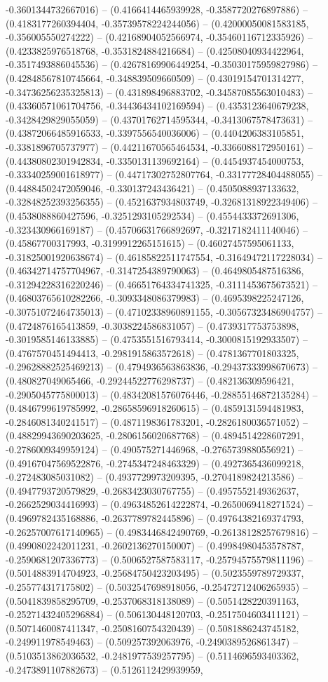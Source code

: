 -0.3601344732667016) -- (0.4166414465939928, -0.3587720276897886) -- (0.4183177260394404, -0.35739578224244056) -- (0.42000050081583185, -0.356005550274222) -- (0.42168904052566974, -0.35460116712335926) -- (0.4233825976518768, -0.3531824884216684) -- (0.42508040934422964, -0.3517493886045536) -- (0.42678169906449254, -0.35030175959827986) -- (0.42848567810745664, -0.348839509660509) -- (0.43019154701314277, -0.34736256235325813) -- (0.431898496883702, -0.34587085563010483) -- (0.43360571061704756, -0.34436434102169594) -- (0.4353123640679238, -0.3428429829055059) -- (0.43701762714595344, -0.3413067578473631) -- (0.43872066485916533, -0.3397556540036006) -- (0.4404206383105851, -0.3381896705737977) -- (0.44211670565464534, -0.3366088172950161) -- (0.44380802301942834, -0.3350131139692164) -- (0.4454937454000753, -0.33340259001618977) -- (0.44717302752807764, -0.33177728404488055) -- (0.44884502472059046, -0.330137243436421) -- (0.4505088937133632, -0.32848252393256355) -- (0.4521637934803749, -0.32681318922349406) -- (0.4538088860427596, -0.3251293105292534) -- (0.4554433372691306, -0.323430966169187) -- (0.45706631766892697, -0.3217182411140046) -- (0.45867700317993, -0.3199912265151615) -- (0.46027457595061133, -0.31825001920638674) -- (0.46185822511747554, -0.31649472117228034) -- (0.46342714757704967, -0.3147254389790063) -- (0.4649805487516386, -0.31294228316220246) -- (0.46651764334741325, -0.3111453675673521) -- (0.46803765610282266, -0.3093348086379983) -- (0.4695398225247126, -0.30751072464735013) -- (0.47102338960891155, -0.30567323486904757) -- (0.4724876165413859, -0.3038224586831057) -- (0.4739317753753898, -0.3019585146133885) -- (0.4753551516793414, -0.3000815192933507) -- (0.4767570451494413, -0.2981915863572618) -- (0.4781367701803325, -0.29628882525469213) -- (0.4794936563863836, -0.29437333998670673) -- (0.480827049065466, -0.29244522776298737) -- (0.482136309596421, -0.2905045775800013) -- (0.48342081576076446, -0.28855146872135284) -- (0.4846799619785992, -0.28658596918260615) -- (0.4859131594481983, -0.2846081340241517) -- (0.4871198361783201, -0.2826180036571052) -- (0.48829943690203625, -0.2806156020687768) -- (0.4894514228607291, -0.2786009349959124) -- (0.490575271446968, -0.2765739880556921) -- (0.49167047569522876, -0.2745347248463329) -- (0.4927365436099218, -0.272483085031082) -- (0.4937729973209395, -0.2704189824213586) -- (0.4947793720579829, -0.2683423030767755) -- (0.4957552149362637, -0.2662529034416993) -- (0.49634852614222874, -0.2650069418271524) -- (0.4969782435168886, -0.2637789782445896) -- (0.49764382169374793, -0.26257007617140965) -- (0.4983446842490769, -0.26138128257679816) -- (0.4990802242011231, -0.2602136270150007) -- (0.49984980453578787, -0.2590681207336773) -- (0.5006527587583117, -0.25794575579811196) -- (0.5014883914704923, -0.25684750423203495) -- (0.5023559789729337, -0.255774317175802) -- (0.5032547698918056, -0.25472712406265935) -- (0.5041839858295709, -0.2537068318138089) -- (0.5051428220391163, -0.25271432405296884) -- (0.506130448120703, -0.2517504603411121) -- (0.5071460087411347, -0.2508160754320439) -- (0.5081886243745182, -0.249911978549463) -- (0.509257392063976, -0.2490389526861347) -- (0.5103513862036532, -0.2481977539257795) -- (0.5114696593403362, -0.2473891107882673) -- (0.5126112429939959, 